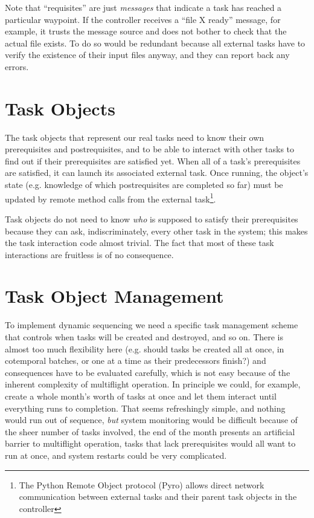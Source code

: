 \documentclass[11pt,a4paper]{report}
\begin{document}
Note that ``requisites'' are just {\em messages} that indicate a task
has reached a particular waypoint.  If the controller receives a ``file
X ready'' message, for example, it trusts the message source and does
not bother to check that the actual file exists. To do so would be
redundant because all external tasks have to verify the existence of
their input files anyway, and they can report back any errors.


\section{Task Objects}

The task objects that represent our real tasks need to know their own
prerequisites and postrequisites, and to be able to interact with other
tasks to find out if their prerequisites are satisfied yet. When all of
a task's prerequisites are satisfied, it can launch its associated
external task. Once running, the object's state (e.g. knowledge of which
postrequisites are completed so far) must be updated by remote method
calls from the external task\footnote{The Python Remote Object protocol
(Pyro) allows direct network communication between external tasks and
their parent task objects in the controller}. 

Task objects do not need to know {\em who} is supposed to satisfy their
prerequisites because they can ask, indiscriminately, every other task
in the system; this makes the task interaction code almost trivial. The
fact that most of these task interactions are fruitless is of no
consequence. 

\section{Task Object Management}

To implement dynamic sequencing we need a specific task management
scheme that controls when tasks will be created and destroyed, and so
on. There is almost too much flexibility here (e.g.  should tasks be
created all at once, in cotemporal batches, or one at a time as their
predecessors finish?) and consequences have to be evaluated carefully,
which is not easy because of the inherent complexity of multiflight
operation. In principle we could, for example, create a whole month's
worth of tasks at once and let them interact until everything runs to
completion. That seems refreshingly simple, and nothing would run out of
sequence, {\em but} system monitoring would be difficult because of the
sheer number of tasks involved, the end of the month presents an
artificial barrier to multiflight operation, tasks that lack
prerequisites would all want to run at once, and system restarts could
be very complicated. 
\end{document}
